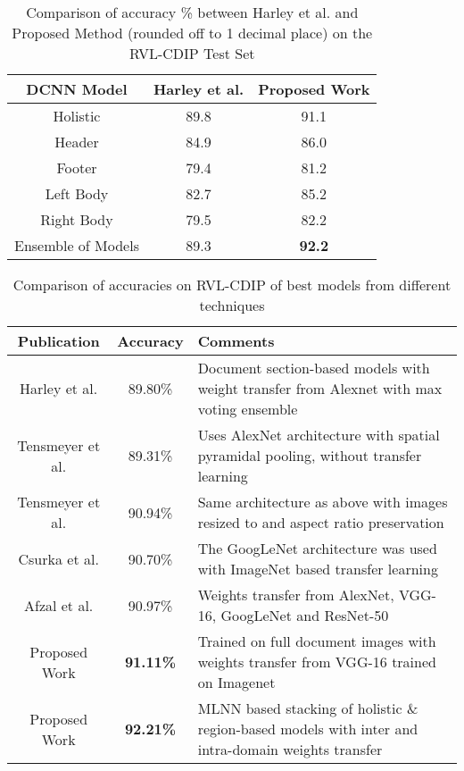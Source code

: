 \documentclass[10pt,conference,a4paper]{IEEEtran}
\begin{document}
\begin{table}[]
	\centering
	\caption{Comparison of accuracy \% between Harley et al. and Proposed Method (rounded off to 1 decimal place) on the RVL-CDIP Test Set}
	\label{Tab:RegionAccs}
	\begin{tabular}{|c|c|c|}
		\hline
		\textbf{DCNN Model} & \textbf{Harley et al.} & \textbf{Proposed Work} \\
		\hline \hline
		Holistic            & 89.8                   & 91.1                  \\
		Header              & 84.9                   & 86.0                  \\
		Footer              & 79.4                   & 81.2                  \\
		Left Body           & 82.7                   & 85.2                  \\
		Right Body          & 79.5                   & 82.2                  \\
		\hline
		Ensemble of Models  & 89.3                   & \textbf{92.2} \\
		\hline
	\end{tabular}
\end{table}

\begin{table}[]
	\centering
	\caption{Comparison of accuracies on RVL-CDIP of best models from different techniques}
	\label{Tab:FinalComp}
	\begin{tabularx}{\columnwidth}{|c|c|m{}|}
		\hline
		\textbf{Publication} & \textbf{Accuracy} & \textbf{\hspace{0.16\columnwidth}Comments}\\
		\hline \hline
		Harley et al.\cite{harley2015evaluation}        & 89.80\%            & {Document section-based models with weight transfer from Alexnet with max voting ensemble \centering}\\
		\hline
		Tensmeyer et al.\cite{tensmeyer2017analysis}     & 89.31\%           & Uses AlexNet architecture with spatial pyramidal pooling, without transfer learning\\
		\hline		
		Tensmeyer et al.\cite{tensmeyer2017analysis}    & 90.94\%           & Same architecture as above with images resized to  and aspect ratio preservation\\
		\hline
		Csurka et al. \cite{csurka2016right}        & 90.70\%           & The GoogLeNet architecture was used with ImageNet based transfer learning\\
		\hline
		Afzal et al. \cite{afzal2017cutting}        & 90.97\%           & Weights transfer from AlexNet, VGG-16, GoogLeNet and ResNet-50\\
		\hline		
		Proposed Work         & \textbf{91.11\%}           & Trained on full document images with weights transfer from VGG-16 trained on Imagenet\\
		\hline
		Proposed Work         & \textbf{92.21\%}           & MLNN based stacking of holistic \& region-based models with inter and intra-domain weights transfer\\
		\hline
	\end{tabularx}
\end{table}
\end{document}
